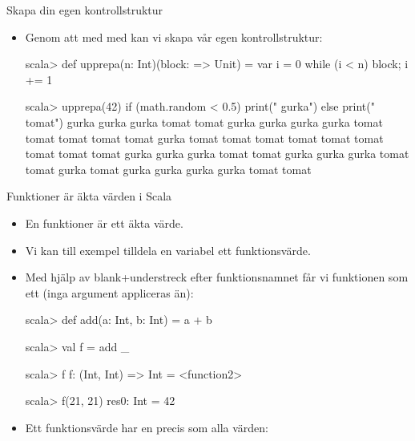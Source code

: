 \begin{Slide}{Skapa din egen kontrollstruktur}
\begin{itemize}
\item Genom att   med  med  kan vi skapa vår egen kontrollstruktur:
\begin{REPLnonum}
scala> def upprepa(n: Int)(block: => Unit) = { 
         var i = 0
         while (i < n) { block; i += 1 }
       }

scala> upprepa(42){ 
         if (math.random < 0.5) {
           print(" gurka")
         } else {
           print(" tomat")
         }
       }
 gurka gurka gurka tomat tomat gurka gurka gurka gurka tomat tomat tomat tomat tomat gurka tomat tomat tomat tomat tomat tomat tomat tomat tomat gurka gurka gurka tomat tomat gurka gurka gurka tomat tomat gurka tomat gurka gurka gurka gurka tomat tomat
\end{REPLnonum}
\end{itemize}
\end{Slide} 


\begin{Slide}{Funktioner är äkta värden i Scala}\SlideFontSmall
\begin{itemize}
\item En funktioner är ett äkta värde.
\item Vi kan till exempel tilldela en variabel ett funktionsvärde. 
\item Med hjälp av blank+understreck efter funktionsnamnet får vi funktionen som ett  (inga argument appliceras än):
\begin{REPLnonum}
scala> def add(a: Int, b: Int) = a + b

scala> val f = add _

scala> f
f: (Int, Int) => Int = <function2>

scala> f(21, 21)
res0: Int = 42
\end{REPLnonum}

\item Ett funktionsvärde har en  precis som alla värden: \\ 
\end{itemize}
\end{Slide} 

